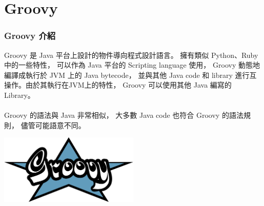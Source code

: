 \documentclass{beamer}
\begin{document}

\fi
\section{Groovy}
\begin{frame}
  \frametitle{Groovy 介紹}
  Groovy 是 Java 平台上設計的物件導向程式設計語言。
  擁有類似 Python、Ruby 中的一些特性，
  可以作為 Java 平台的 Scripting language 使用，
  Groovy 動態地編譯成執行於 JVM 上的 Java bytecode，
  並與其他 Java code 和 library 進行互操作。由於其執行在JVM上的特性，
  Groovy 可以使用其他 Java 編寫的 Library。~\\~\\
  Groovy 的語法與 Java 非常相似，
  大多數 Java code 也符合 Groovy 的語法規則，
  儘管可能語意不同。~\\
  \begin{center}
    \includegraphics[width=0.5\textwidth]{picture/Groovy-logo.png}
  \end{center}
\end{frame}
\end{document}
